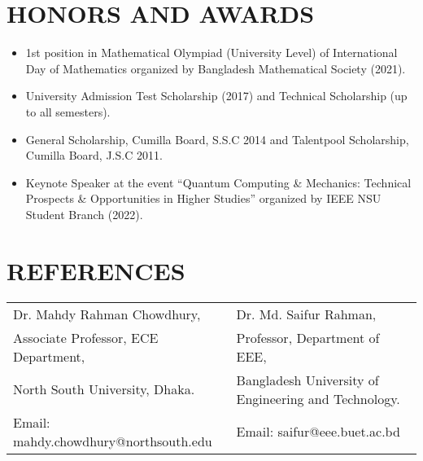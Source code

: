 \documentclass[letterpaper,11pt]{article}
\begin{document}
\section*{\textbf{HONORS AND AWARDS}}
\begin{itemize}[left=0cm]
    \setlength\itemsep{-0.075em} %
    \setlength\parskip{-0.075em} %
    \item 1st position in Mathematical Olympiad (University Level) of International Day of Mathematics \mbox{organized} by Bangladesh Mathematical Society (2021).
    \item University Admission Test Scholarship (2017) and Technical Scholarship (up to all semesters).
    \item General Scholarship, Cumilla Board, S.S.C 2014 and Talentpool Scholarship, Cumilla Board, J.S.C 2011.

        \item Keynote Speaker at the event ``Quantum Computing \& Mechanics: Technical Prospects \& Opportunities in Higher Studies'' organized by IEEE NSU Student Branch (2022).
\end{itemize}




\section*{\textbf{REFERENCES}}
\begin{tabular}{@{}p{} p{}}
    Dr. Mahdy Rahman Chowdhury, & Dr. Md. Saifur Rahman, \\
    Associate Professor, ECE Department, & Professor, Department of EEE, \\
    North South University, Dhaka. & Bangladesh University of Engineering and Technology. \\
    Email: mahdy.chowdhury@northsouth.edu & Email: saifur@eee.buet.ac.bd \\
\end{tabular}
\end{document}
